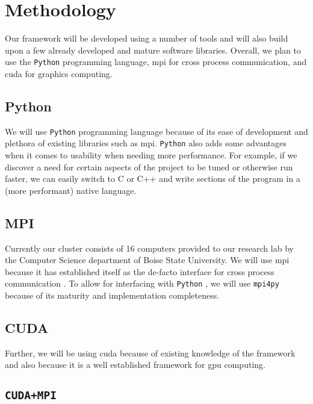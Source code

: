 \section{Methodology}

Our framework will be developed using a number of tools and will also build
upon a few already developed and mature software libraries. Overall, we plan to
use the \texttt{Python} programming language, \gls{mpi} for cross process
communication, and \gls{cuda} for graphics computing.

\subsection{Python}

We will use \texttt{Python} programming language because of its ease of
development and plethora of existing libraries such as \gls{mpi}.
\texttt{Python} also adds some advantages when it comes to usability when
needing more performance.  For example, if we discover a need for certain
aspects of the project to be tuned or otherwise run faster, we can easily
switch to C or C++ and write sections of the program in a (more performant)
native language.

\subsection{MPI}

Currently our cluster consists of 16 computers provided to our research lab by
the Computer Science department of Boise State University. We will use
\gls{mpi} because it has established itself as the de-facto interface for cross
process communication \cite{website:MPI-Tutorial}. To allow for interfacing
with \texttt{Python} \cite{website:mpi-4-python}, we will use \texttt{mpi4py}
because of its maturity and implementation completeness.

\subsection{CUDA}

Further, we will be using \gls{cuda} because of existing knowledge of the
framework and also because it is a well established framework for \gls{gpu}
computing.


\subsection{\texttt{CUDA+MPI}}

